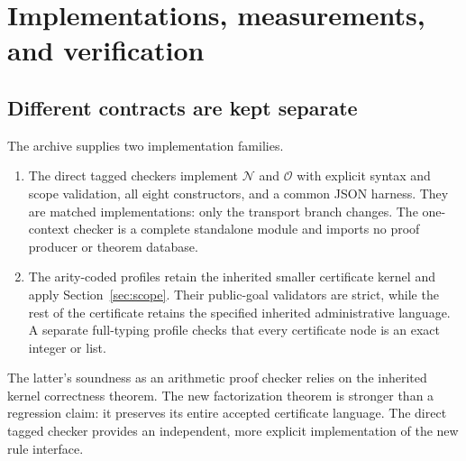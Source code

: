 \documentclass[11pt,letterpaper]{article}
\theoremstyle{definition}\newtheorem{definition}[theorem]{Definition}
\theoremstyle{remark}\newtheorem{remark}[theorem]{Remark}
\newcommand{\N}{\mathcal N}
\newcommand{\Ocal}{\mathcal O}
\begin{document}
\section{Implementations, measurements, and verification}
\label{sec:measure}
\subsection{Different contracts are kept separate}
The archive supplies two implementation families.
\begin{enumerate}
\item The direct tagged checkers implement \(\N\) and \(\Ocal\) with
  explicit syntax and scope validation, all eight constructors, and a
  common JSON harness. They are matched implementations: only the
  transport branch changes. The one-context checker is a complete
  standalone module and imports no proof producer or theorem database.
\item The arity-coded profiles retain the inherited smaller certificate
  kernel and apply Section~\ref{sec:scope}. Their public-goal validators
  are strict, while the rest of the certificate retains the specified
  inherited administrative language. A separate full-typing profile
  checks that every certificate node is an exact integer or list.
\end{enumerate}
The latter's soundness as an arithmetic proof checker relies on the
inherited kernel correctness theorem. The new factorization theorem is
stronger than a regression claim: it preserves its entire accepted
certificate language. The direct tagged checker provides an independent,
more explicit implementation of the new rule interface.
\end{document}
